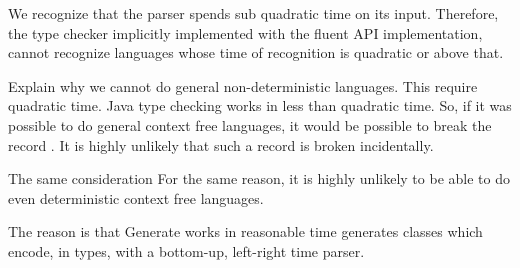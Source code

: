 We recognize that the \Java parser spends sub quadratic time 
  on its input.
Therefore, 
  the type checker implicitly implemented with the fluent API implementation, 
  cannot recognize languages whose time of recognition is quadratic or above that. 

Explain why we cannot do general non-deterministic languages. This require quadratic time.
Java type checking works in less than quadratic time. So, if it was possible to 
do general context free languages, it would be possible to break the record 
  \cite{cubic time algorithms}.
It is highly unlikely that such a record is broken incidentally.

The same consideration
For the same reason, it is highly unlikely to be able to do even deterministic context free languages.
   \cite{http://www.sciencedirect.com/science/article/pii/S0019995868910875}

The reason is that Generate works in reasonable time  \Self generates classes which encode, in types, with a bottom-up, left-right time parser.
